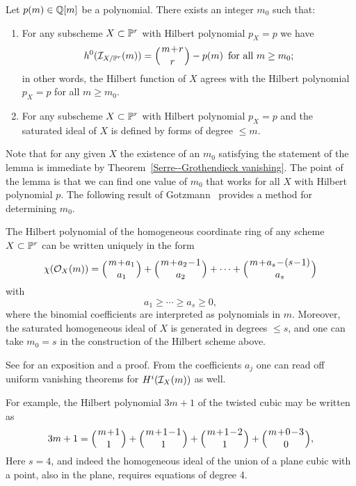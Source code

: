 \begin{npt}
\begin{theorem}
\label{matsusaka}
Let $p(m) \in {\mathbb Q}[m]$ be a polynomial. There exists an integer $m_0$
%
such that:

\begin{enumerate}
\item For any subscheme $X \subset {\mathbb P}^r$ with Hilbert polynomial
$p_X = p$ we have
$$
h^0(\cI_{X/\PP^r}(m)) = \mbinom{m+r}{r} - p(m) \quad \text{for all }
m \geq m_0;
$$
in other words, the Hilbert function of $X$ agrees with the Hilbert
polynomial $p_X = p$ for all $m \geq m_0$.

\item For any subscheme $X \subset {\mathbb P}^r$ with Hilbert polynomial $p_X =
p$ and
%
the saturated ideal of $X$ is defined by forms of degree $\leq m$.
\end{enumerate}
\end{theorem}
\end{npt}

Note that for any given $X$ the existence of an $m_0$ satisfying the
%
statement of the lemma is immediate by
Theorem~\ref{Serre--Grothendieck vanishing}. The point of the lemma is
that we can find one value of $m_0$ that works for all $X$ with
Hilbert polynomial $p$. The following result of Gotzmann~\citeyear{Gotzmann}
%
provides a method for determining $m_0$.

\begin{theorem}
The Hilbert polynomial  of the homogeneous coordinate ring of any scheme
$X\subset {\mathbb P}^r$ can be written uniquely in the form
$$
\chi(\sO_X(m)) = \mbinom{m+a_1}{a_1}+ \mbinom{m+a_2 -1}{a_2}+ \cdots+\mbinom{m+a_s -(s-1)}{a_s}
$$
with
$$
a_1\geq \cdots \geq a_s \geq 0,
$$
where the binomial coefficients are interpreted as polynomials in
$m$. Moreover, the saturated homogeneous ideal of $X$ is
 generated in degrees $\leq s$, and one can take $m_0 = s$ in the
 construction of the Hilbert scheme above.
\unif
\end{theorem}

See \cite{MR1023391} %
for an exposition and a proof. From the coefficients $a_j$ one can read
off uniform vanishing theorems for $H^i({\mathcal I}_X(m))$
 as well.

 For example, the Hilbert polynomial $3m+1$ of the twisted cubic may be
 written as
 $$
 3m+1 =  \mbinom{m+1}{1}+ \mbinom{m+1 -1}{1}+\mbinom{m+1 -2}{1}+
\mbinom{m+0 -3}{0},
 $$
 Here $s=4$, and indeed the homogeneous ideal of the union of a plane
 cubic with a point, also in the plane,
 requires equations of degree 4.

